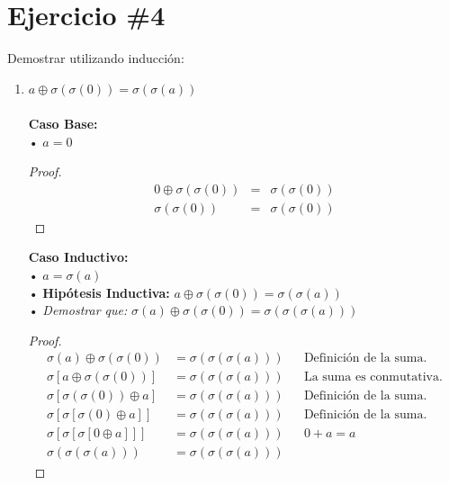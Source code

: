 \documentclass[11pt,letterpaper]{article}
\begin{document}
\section*{Ejercicio \#4}
\noindent Demostrar utilizando inducción:
\begin{enumerate}
\item{$a\oplus \sigma(\sigma(0))=\sigma(\sigma(a))$} \\
\\
\noindent \textbf{\large Caso Base:} \\
\noindent • $a=0$
\begin{proof}
\begin{eqnarray*}
0 \oplus \sigma(\sigma(0)) &=& \sigma(\sigma(0)) \\
\sigma(\sigma(0))&=& \sigma(\sigma(0))
\end{eqnarray*}
\end{proof}

\vspace{0.1cm}

\noindent \textbf{\large Caso Inductivo:}\\
\noindent • $a=\sigma(a)$ \\
\noindent • \textbf{Hipótesis Inductiva: } $a \oplus \sigma(\sigma(0)) = \sigma(\sigma(a))$ \\
\noindent • \emph{Demostrar que:} $\sigma(a) \oplus \sigma(\sigma(0)) = \sigma(\sigma(\sigma(a)))$

\begin{proof}
\begin{align}
\sigma(a) \oplus \sigma(\sigma(0)) &= \sigma(\sigma(\sigma(a))) && \text{Definición de la suma.}\\
\sigma[ a \oplus \sigma(\sigma(0))] &= \sigma(\sigma(\sigma(a))) && \text{La suma es conmutativa.}\\
\sigma[\sigma(\sigma(0)) \oplus a] &= \sigma(\sigma(\sigma(a))) && \text{Definición de la suma.}\\
\sigma[\sigma[\sigma(0) \oplus a]] &= \sigma(\sigma(\sigma(a))) && \text{Definición de la suma.}\\
\sigma[\sigma[\sigma[ 0 \oplus a]]] &= \sigma(\sigma(\sigma(a))) && \text{$0+a=a$}\\
\sigma(\sigma(\sigma(a))) &= \sigma(\sigma(\sigma(a)))
\end{align}
\end{proof}	



\end{enumerate}
\end{document}
